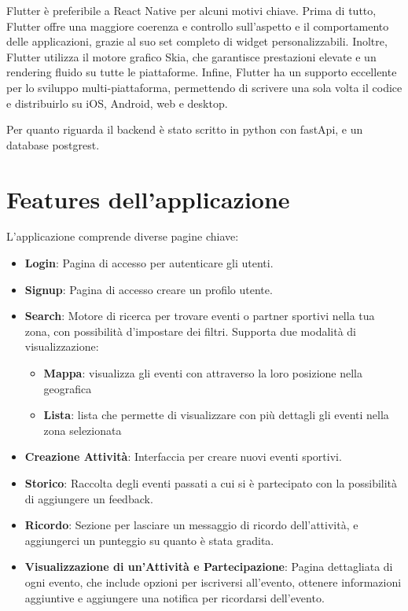 \documentclass[a4paper,12pt]{article}
\begin{document}
Flutter è preferibile a React Native per alcuni motivi chiave. Prima di tutto, Flutter offre una maggiore coerenza e controllo sull'aspetto e il comportamento delle applicazioni, grazie al suo set completo di widget personalizzabili.
Inoltre, Flutter utilizza il motore grafico Skia, che garantisce prestazioni elevate e un rendering fluido su tutte le piattaforme. 
Infine, Flutter ha un supporto eccellente per lo sviluppo multi-piattaforma, permettendo di scrivere una sola volta il codice e distribuirlo su iOS, Android, web e desktop.


Per quanto riguarda il backend è stato scritto in python con fastApi, e un database postgrest.

\newpage
\section{Features dell'applicazione}

L'applicazione comprende diverse pagine chiave:

\begin{itemize}
    \item \textbf{Login}: Pagina di accesso per autenticare gli utenti.
    \item \textbf{Signup}: Pagina di accesso creare un profilo utente.
    \item \textbf{Search}: Motore di ricerca per trovare eventi o partner sportivi nella tua zona, con possibilità d'impostare dei filtri. Supporta due modalità di visualizzazione:
    \begin{itemize}
        \item \textbf{Mappa}: visualizza gli eventi con attraverso la loro posizione nella geografica
        \item \textbf{Lista}: lista che permette di visualizzare con più dettagli gli eventi nella zona selezionata
    \end{itemize}
    \item \textbf{Creazione Attività}: Interfaccia per creare nuovi eventi sportivi.
    \item \textbf{Storico}: Raccolta degli eventi passati a cui si è partecipato con la possibilità di aggiungere un feedback.
    \item \textbf{Ricordo}: Sezione per lasciare un messaggio di ricordo dell'attività, e aggiungerci un punteggio su quanto è stata gradita.
    \item \textbf{Visualizzazione di un'Attività e Partecipazione}: Pagina dettagliata di ogni evento, che include opzioni per iscriversi all'evento, ottenere informazioni aggiuntive e aggiungere una notifica per ricordarsi dell'evento.
\end{itemize}
\end{document}
